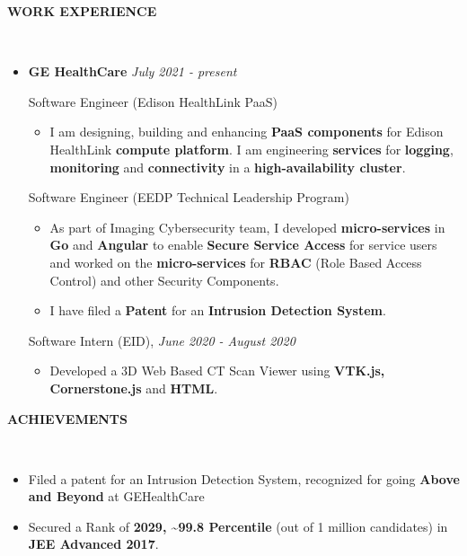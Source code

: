 \documentclass[a4paper,10pt]{article}
\newcommand{\isep}{-2 pt}
\newcommand{\lsep}{-0.6cm}
\newcommand{\resheading}[1]{{\small \colorbox{mygrey}{\begin{minipage}{0.975\textwidth}{\textbf{#1 \vphantom{p\^{E}}}}\end{minipage}}}}
\begin{document}
\resheading{\textbf{WORK EXPERIENCE} }\\[\lsep]
\vspace{2.0pt}
\begin{itemize}
\item \textbf{GE HealthCare} \hfill \emph{July 2021 - present}
\setlength{\itemsep}{1pt}
\setlength{\parskip}{0pt}
\setlength{\parsep}{0pt}

Software Engineer (Edison HealthLink PaaS)
	\begin{itemize}\itemsep \isep
	\item I am designing, building and enhancing \textbf{PaaS components} for Edison HealthLink \textbf{compute platform}. I am engineering \textbf{services} for \textbf{logging}, \textbf{monitoring} and \textbf{connectivity} in a \textbf{high-availability cluster}.   
	\end{itemize}

Software Engineer (EEDP Technical Leadership Program)
	\begin{itemize}\itemsep \isep
	\item As part of Imaging Cybersecurity team, I developed \textbf{micro-services} in \textbf{Go} and \textbf{Angular} to enable \textbf{Secure Service Access} for service users and worked on the \textbf{micro-services} for \textbf{RBAC} (Role Based Access Control) and other Security Components.
	\item I have filed a \textbf{Patent} for an \textbf{Intrusion Detection System}.
	\end{itemize}

Software Intern (EID), \hfill \emph{June 2020 - August 2020}
	\begin{itemize}\itemsep \isep
	\item  Developed a 3D Web Based CT Scan Viewer using \textbf{VTK.js, Cornerstone.js} and \textbf{HTML}.
	\end{itemize}
\end{itemize}

\resheading{\textbf{ACHIEVEMENTS} }\\[\lsep]
\vspace{1.0pt}

\begin{itemize}
\setlength{\itemsep}{1pt}
\setlength{\parskip}{0pt}
\setlength{\parsep}{0pt}
\item Filed a patent for an Intrusion Detection System, recognized for going \textbf{Above and Beyond} at GEHealthCare
\item Secured a Rank of \textbf{2029, \textasciitilde 99.8 Percentile} (out of 1 million candidates) in \textbf{JEE
Advanced 2017}.
\end{itemize}
\end{document}
